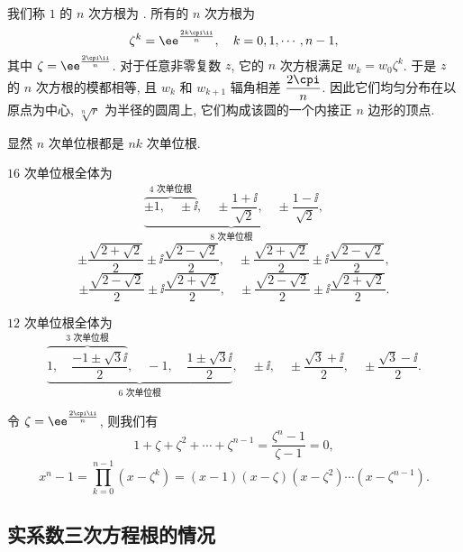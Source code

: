 我们称 $1$ 的 $n$ 次方根为 .
所有的 $n$ 次方根为
\[
  \zeta^k=\ee^{\frac{2k\cpi \ii}n},\quad k=0,1,\cdots,n-1,
\]
其中 $\zeta=\ee^{\frac{2\cpi \ii}n}$.
对于任意非零复数 $z$, 它的 $n$ 次方根满足 $w_k=w_0\zeta^k$.
于是 $z$ 的 $n$ 次方根的模都相等, 且 $w_k$ 和 $w_{k+1}$ 辐角相差 $\dfrac{2\cpi}n$.
因此\alert{它们均匀分布在以原点为中心, $\sqrt[n]r$ 为半径的圆周上}, 它们构成该圆的一个内接正 $n$ 边形的顶点.

\begin{example}
  显然 $n$ 次单位根都是 $nk$ 次单位根.
  \begin{enumr}
    \item $16$ 次单位根全体为
    \[
      \underbrace{
        \overbrace{
          \pm1,\quad
          \pm \ii
        }^{\text{$4$ 次单位根}},\quad
        \pm\frac{1+\ii}{\sqrt2},\quad
        \pm\frac{1-\ii}{\sqrt2}
      }_{\text{$8$ 次单位根}},
    \]
    \[
      \pm\frac{\sqrt{2+\sqrt2}}2\pm\ii\frac{\sqrt{2-\sqrt2}}2,\quad
      \pm\frac{\sqrt{2+\sqrt2}}2\pm\ii\frac{\sqrt{2-\sqrt2}}2,
    \]
    \[
      \pm\frac{\sqrt{2-\sqrt2}}2\pm\ii\frac{\sqrt{2+\sqrt2}}2,\quad
      \pm\frac{\sqrt{2-\sqrt2}}2\pm\ii\frac{\sqrt{2+\sqrt2}}2.
    \]
    \vspace{-\baselineskip}
    \item $12$ 次单位根全体为
    \[
      \underbrace{
        \overbrace{
          1,\quad
          \frac{-1\pm\sqrt3\ii}2
        }^{\text{$3$ 次单位根}},\quad
        -1,\quad
        \frac{1\pm\sqrt3\ii}2
      }_{\text{$6$ 次单位根}},\quad
      \pm\ii,\quad
      \pm\frac{\sqrt 3+\ii}2,\quad
      \pm\frac{\sqrt 3-\ii}2.
    \]
    \vspace{-\baselineskip}
    \item 令 $\zeta=\ee^{\frac{2\cpi \ii}n}$, 则我们有
    \[
      1+\zeta+\zeta^2+\cdots+\zeta^{n-1}
      =\frac{\zeta^n-1}{\zeta-1}=0,
    \]
    \[
        x^n-1
      =\prod_{k=0}^{n-1}(x-\zeta^k)
      =(x-1)(x-\zeta)(x-\zeta^2)\cdots(x-\zeta^{n-1}).
    \]
  \end{enumr}
\end{example}


\subsection{实系数三次方程根的情况\optional}
\label{ssec:real-cubic-equation}

